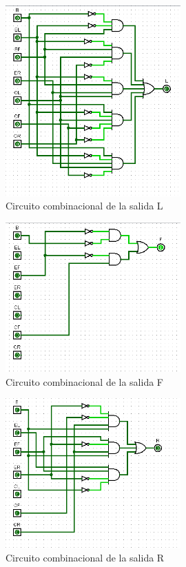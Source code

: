\documentclass[a4paper]{article}
\begin{document}
\begin{figure}[!htbp]
    \centering
    \includegraphics[width=0.6\textwidth]{circuito_L.png}
    \caption{Circuito combinacional de la salida L}
    \label{fig:CircL}
\end{figure}
\begin{figure}[!htbp]
    \centering
    \includegraphics[width=0.6\textwidth]{circuito_F.png}
    \caption{Circuito combinacional de la salida F}
    \label{fig:CircF}
\end{figure}
\begin{figure}[!htbp]
    \centering
    \includegraphics[width=0.6\textwidth]{circuito_R.png}
    \caption{Circuito combinacional de la salida R}
    \label{fig:CircR}
\end{figure}
\end{document}
